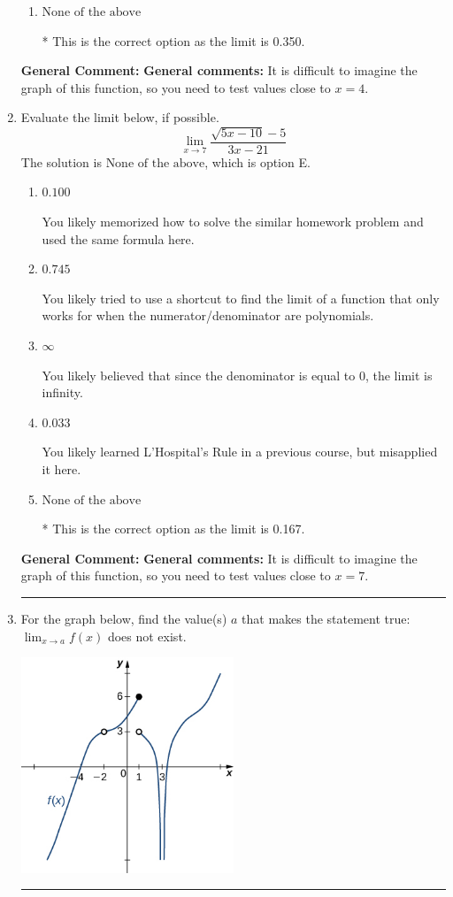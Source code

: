 \documentclass{extbook}[14pt]
\newcommand{\litem}[1]{\item #1

\rule{\textwidth}{0.4pt}}
\begin{document}
\begin{enumerate}
{\begin{enumerate}[label=\Alph*.]
You likely memorized how to solve the similar homework problem and used the same formula here.
\item \( \text{None of the above} \)

* This is the correct option as the limit is 0.350.
\end{enumerate}

\textbf{General Comment:} \textbf{General comments:} It is difficult to imagine the graph of this function, so you need to test values close to $x = 4$.
}
\litem{
Evaluate the limit below, if possible.
\[ \lim_{x \rightarrow 7} \frac{\sqrt{5x - 10} - 5}{3x - 21} \]The solution is \( \text{None of the above} \), which is option E.\begin{enumerate}[label=\Alph*.]
\item \( 0.100 \)

You likely memorized how to solve the similar homework problem and used the same formula here.
\item \( 0.745 \)

You likely tried to use a shortcut to find the limit of a function that only works for when the numerator/denominator are polynomials.
\item \( \infty \)

You likely believed that since the denominator is equal to 0, the limit is infinity.
\item \( 0.033 \)

You likely learned L'Hospital's Rule in a previous course, but misapplied it here.
\item \( \text{None of the above} \)

* This is the correct option as the limit is 0.167.
\end{enumerate}

\textbf{General Comment:} \textbf{General comments:} It is difficult to imagine the graph of this function, so you need to test values close to $x = 7$.
}
\litem{
For the graph below, find the value(s) $a$ that makes the statement true: $ \displaystyle \lim_{x \rightarrow a} f(x)$ does not exist.

\begin{center}
    \includegraphics[width=0.5\textwidth]{../Figures/evaluateLimitGraphicallyB.png}
\end{center}


}
\end{enumerate}
\end{document}

